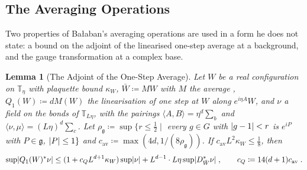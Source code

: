 \documentclass[11pt]{preprint}
\DeclarePairedDelimiter{\abs}{\lvert}{\rvert}
\numberwithin{equation}{section}
\newtheorem{lemma}{Lemma}[section]
\theoremstyle{definition}
\theoremstyle{remark}
\theoremstyle{plain}
\begin{document}
\subsection{The Averaging Operations}

Two properties of Ba{\l}aban's averaging operations \cite{BalabanAVG} are used in a form he does not state: a bound on the adjoint of the linearised one-step average at a background, and the gauge transformation \cite[(106), p.~33]{BalabanAVG} at a complex base.

\begin{lemma}[The Adjoint of the One-Step Average]\label{lem:cmp98-adjoint}
Let $W$ be a real configuration on $\mathbb T_\eta$ with plaquette bound $\kappa_W$, $\bar W \coloneqq MW$ with $M$ the average \cite[(0.4)]{BalabanRG1}, $Q_1(W) \coloneqq dM(W)$ the linearisation of one step at $W$ along $e^{i\eta A}W$, and $\nu$ a field on the bonds of $\mathbb T_{L\eta}$, with the pairings $\langle A, B\rangle = \eta^d\sum_b$ and $\langle\nu, \mu\rangle = (L\eta)^d\sum_c$. Let $\rho_{\mathfrak g} \coloneqq \sup\{r \leq \frac12 \mid$ every $g \in G$ with $\abs{g - 1} < r$ is $e^{iP}$ with $P \in \mathfrak g$, $\abs P \leq 1\}$ and $c_{\mathrm{av}} \coloneqq \max(4d, 1/(8\rho_{\mathfrak g}))$. If $c_{\mathrm{av}}L^2\kappa_W \leq \frac18$, then
\begin{equation}\label{eq:adjoint-average}
    \sup\abs{Q_1(W)^*\nu} \leq (1 + c_QL^{d+1}\kappa_W)\sup\abs\nu + L^{d-1} \cdot L\eta\sup\abs{D^*_{\bar W}\nu}\;,
    \qquad
    c_Q \coloneqq 14(d + 1)c_{\mathrm{av}}\;.
\end{equation}
\end{lemma}
\end{document}
